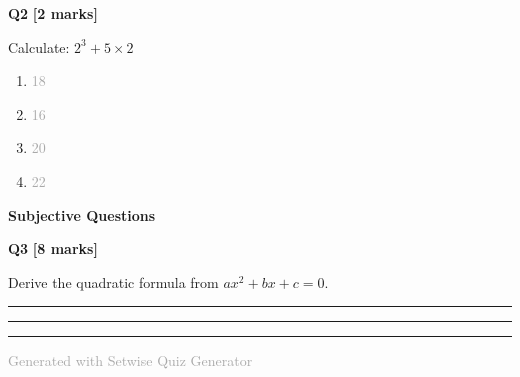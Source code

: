 \documentclass[10pt,twocolumn]{article}
\begin{document}
\begin{compactmcq}
\textcolor{primaryblue}{\small\textbf{Q2}} \hfill \textcolor{accentorange}{\small\textbf{[2 marks]}}

\small Calculate: $2^3 + 5 \times 2$

\vspace{2pt}
\begin{multicols}{2}
\begin{enumerate}[label=\textbf{(\Alph*)}, leftmargin=15pt, itemsep=1pt, parsep=0pt]

  \item \textcolor{darkgray}{\small 18}

  \item \textcolor{darkgray}{\small 16}

  \item \textcolor{darkgray}{\small 20}

  \item \textcolor{darkgray}{\small 22}

\end{enumerate}
\end{multicols}
\end{compactmcq}
\vspace{2pt}


\vspace{4pt}



\textcolor{accentorange}{\textbf{Subjective Questions}}
\vspace{2pt}


\begin{compactsubjective}
\textcolor{primaryblue}{\small\textbf{Q3}} \hfill \textcolor{accentorange}{\small\textbf{[8 marks]}}

\small Derive the quadratic formula from $ax^2 + bx + c = 0$.

\vspace{4pt}
\rule{\linewidth}{0.3pt}
\vspace{4pt}
\rule{\linewidth}{0.3pt}
\vspace{4pt}
\rule{\linewidth}{0.3pt}
\end{compactsubjective}
\vspace{3pt}

\vspace{3pt}



\vfill
\begin{center}
  \textcolor{darkgray}{\tiny Generated with Setwise Quiz Generator}
\end{center}
\end{document}
